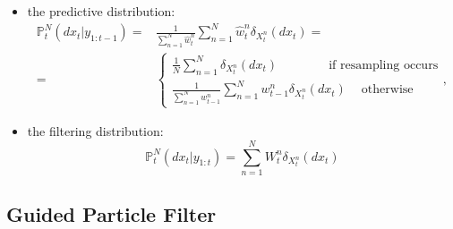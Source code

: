 \documentclass[
]{book}
\theoremstyle{break}
\theoremstyle{nonumberplain}
\begin{document}
\begin{itemize}
    \item the predictive distribution:
    \begin{equation}
    \begin{split}
        \mathbb P_t^N (dx_t|y_{1:t-1})=&\frac{1}{\sum_{n=1}^N\hat w_t^n}\sum_{n=1}^N\hat w_t^n\delta_{X_t^n}(dx_t)=\\
        =&\begin{cases}
        \frac{1}{N}\sum_{n=1}^N\delta_{X_t^n}(dx_t)
        ~~~~~~~~~~~~~~~~ ~\text{ if resampling occurs}\\
        \frac{1}{\sum_{n=1}^N w_{t-1}^n}\sum_{n=1}^Nw_{t-1}^n\delta_{X_t^n}(dx_t)~~~~ \text{ otherwise}
        \end{cases},
        \end{split}
    \end{equation}
    \item the filtering distribution:
    \begin{equation}
        \mathbb P_t^N (dx_t|y_{1:t})=\sum_{n=1}^NW_t^n\delta_{X_t^n}(dx_t)
    \end{equation}
\end{itemize}

\subsection{Guided Particle Filter}
\end{document}
